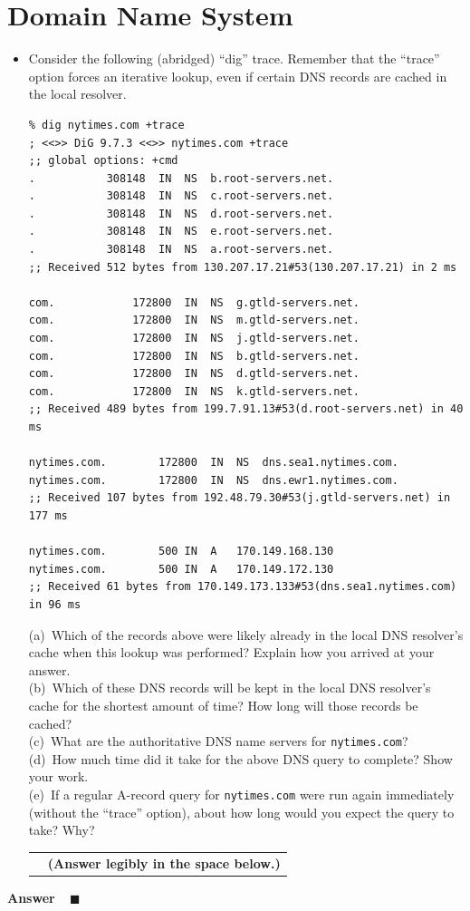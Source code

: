 \documentclass[11pt]{article}
\newcounter{pctr}
\newcommand{\ansbelow}{\probnote{Answer legibly in the space below.}}
\newcommand{\sols}[1]{#1}
\newcommand{\sols}[1]{}
\newcounter{answer}
\newenvironment{answer}[1][\relax]{\refstepcounter{answer}\begin{list}%
 {}{\leftmargin 0pt\rightmargin 0pt\labelsep 3pt\parsep 0pt%
 \setlength{\listparindent}{\parindent}}
    \item {\bf Answer \theanswer #1}\
    }{\hspace*{\fill}$\blacksquare$\end{list}}
\newcommand\prob[1]%
  {\begin{itemize}\item[]%
   \vspace{.2in}{\bf\thepctr. ~[#1~ points]:}\stepcounter{pctr}}
\newcommand\eprob{\end{itemize}}
\newcommand\probnote[1]%
  {\\\begin{tabular}{cr} \hspace{3in} & {\bf (#1)} \\ \end{tabular}}
\begin{document}
\newpage
\section{Domain Name System}
\prob{14} Consider the following (abridged) ``dig'' trace.  Remember that the
``trace'' option forces an iterative lookup, even if certain DNS records
are cached in the local resolver.
\begin{scriptsize}
\begin{verbatim}
% dig nytimes.com +trace
; <<>> DiG 9.7.3 <<>> nytimes.com +trace
;; global options: +cmd
.			308148	IN	NS	b.root-servers.net.
.			308148	IN	NS	c.root-servers.net.
.			308148	IN	NS	d.root-servers.net.
.			308148	IN	NS	e.root-servers.net.
.			308148	IN	NS	a.root-servers.net.
;; Received 512 bytes from 130.207.17.21#53(130.207.17.21) in 2 ms

com.			172800	IN	NS	g.gtld-servers.net.
com.			172800	IN	NS	m.gtld-servers.net.
com.			172800	IN	NS	j.gtld-servers.net.
com.			172800	IN	NS	b.gtld-servers.net.
com.			172800	IN	NS	d.gtld-servers.net.
com.			172800	IN	NS	k.gtld-servers.net.
;; Received 489 bytes from 199.7.91.13#53(d.root-servers.net) in 40 ms

nytimes.com.		172800	IN	NS	dns.sea1.nytimes.com.
nytimes.com.		172800	IN	NS	dns.ewr1.nytimes.com.
;; Received 107 bytes from 192.48.79.30#53(j.gtld-servers.net) in 177 ms

nytimes.com.		500	IN	A	170.149.168.130
nytimes.com.		500	IN	A	170.149.172.130
;; Received 61 bytes from 170.149.173.133#53(dns.sea1.nytimes.com) in 96 ms
\end{verbatim}
\end{scriptsize}
(a)~Which of the records above were likely already in the local DNS
resolver's cache when this lookup was performed?  Explain how you
arrived at your answer. \\
(b)~Which of these DNS records will be kept in the local DNS resolver's
cache for the shortest amount of time?  How long will those records be
cached? \\
(c)~What are the authoritative DNS name servers for {\tt nytimes.com}?
\\
(d)~How much time did it take for the above DNS query to complete? Show
your work. \\
(e)~If a
regular A-record query
for {\tt nytimes.com} were run again immediately (without the ``trace'' option), about how long would you expect the
query to take? Why? 
 \ansbelow \eprob

\sols{
\begin{answer}
\end{answer}
}
\end{document}

